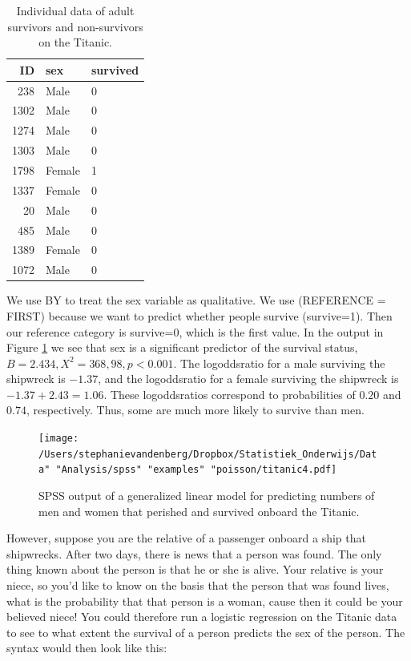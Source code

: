 \documentclass[]{report}\usepackage[]{graphicx}\usepackage[]{color}
\begin{document}
\begin{table}[ht]
\centering
\caption{Individual data of adult survivors and non-survivors on the Titanic.} 
\label{tab:gen_28}
\begin{tabular}{rll}
  \hline
ID & sex & survived \\ 
  \hline
238 & Male & 0 \\ 
  1302 & Male & 0 \\ 
  1274 & Male & 0 \\ 
  1303 & Male & 0 \\ 
  1798 & Female & 1 \\ 
  1337 & Female & 0 \\ 
  20 & Male & 0 \\ 
  485 & Male & 0 \\ 
  1389 & Female & 0 \\ 
  1072 & Male & 0 \\ 
   \hline
\end{tabular}
\end{table}




We use BY to treat the sex variable as qualitative. We use (REFERENCE = FIRST) because we want to predict whether people survive (survive=1). Then our reference category is survive=0, which is the first value.
In the output in Figure \ref{fig:titanic4} we see that sex is a significant predictor of the survival status, $B=2.434, X^2=368,98, p<0.001$. The logoddsratio for a male surviving the shipwreck is $-1.37$, and the logoddsratio for a female surviving the shipwreck is $-1.37+2.43=1.06$. These logoddsratios correspond to probabilities of $0.20$ and $0.74$, respectively. Thus, some are much more likely to survive than men.


\begin{figure}[h]
    \begin{center}
       \texttt{[image: /Users/stephanievandenberg/Dropbox/Statistiek\_Onderwijs/Data" "Analysis/spss" "examples" "poisson/titanic4.pdf]}
    \end{center}
     \caption{SPSS output of a generalized linear model for predicting numbers of men and women that perished and survived onboard the Titanic.}
    \label{fig:titanic4}
\end{figure}

However, suppose you are the relative of a passenger onboard a ship that shipwrecks. After two days, there is news that a person was found. The only thing known about the person is that he or she is alive. Your relative is your niece, so you'd like to know on the basis that the person that was found lives, what is the probability that that person is a woman, cause then it could be your believed niece! You could therefore run a logistic regression on the Titanic data to see to what extent the survival of a person predicts the sex of the person. The syntax would then look like this:
\end{document}
